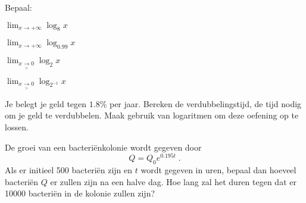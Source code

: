 \documentclass[12pt,twoside,a4paper]{article}
\begin{document}
\begin{oefening}
Bepaal:
\begin{exlist}{2}
  \item $\displaystyle\lim_{x\to +\infty}\log_8 x$
  \item $\displaystyle\lim_{x\to +\infty}\log_{0.99} x$
  \item $\displaystyle\lim_{x\underset{>}{\to} 0}\log_2 x$
  \item $\displaystyle\lim_{x\underset{>}{\to} 0}\log_{2^{-1}} x$
\end{exlist}
\end{oefening}

\begin{oefening}
Je belegt je geld tegen $1.8 \%$ per jaar. Bereken de verdubbelingstijd, de tijd nodig om je geld te verdubbelen. Maak gebruik van logaritmen om deze oefening op te lossen.
\end{oefening}

\begin{oefening} %
De groei van een bacteriënkolonie wordt gegeven door
$$Q=Q_0e^{0.195t}\;.$$
Als er initieel 500 bacteriën zijn en $t$ wordt gegeven in uren, bepaal dan hoeveel bacteriën $Q$ er zullen zijn na een halve dag. Hoe lang zal het duren tegen dat er 10000 bacteriën in de kolonie zullen zijn?
\end{oefening}
\end{document}
